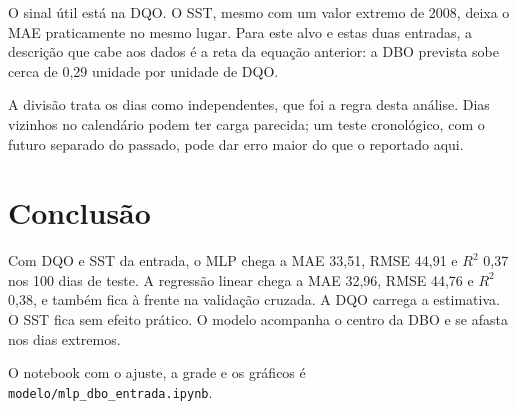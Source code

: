 \documentclass[11pt,a4paper]{article}
\begin{document}
O sinal útil está na DQO. O SST, mesmo com um valor extremo de 2008, deixa o MAE praticamente no mesmo lugar. Para este alvo e estas duas entradas, a descrição que cabe aos dados é a reta da equação anterior: a DBO prevista sobe cerca de 0,29 unidade por unidade de DQO.

A divisão trata os dias como independentes, que foi a regra desta análise. Dias vizinhos no calendário podem ter carga parecida; um teste cronológico, com o futuro separado do passado, pode dar erro maior do que o reportado aqui.

\section{Conclusão}

Com DQO e SST da entrada, o MLP chega a MAE 33,51, RMSE 44,91 e \(R^{2}\) 0,37 nos 100 dias de teste. A regressão linear chega a MAE 32,96, RMSE 44,76 e \(R^{2}\) 0,38, e também fica à frente na validação cruzada. A DQO carrega a estimativa. O SST fica sem efeito prático. O modelo acompanha o centro da DBO e se afasta nos dias extremos.

O notebook com o ajuste, a grade e os gráficos é \texttt{modelo/mlp\_dbo\_entrada.ipynb}.
\end{document}
